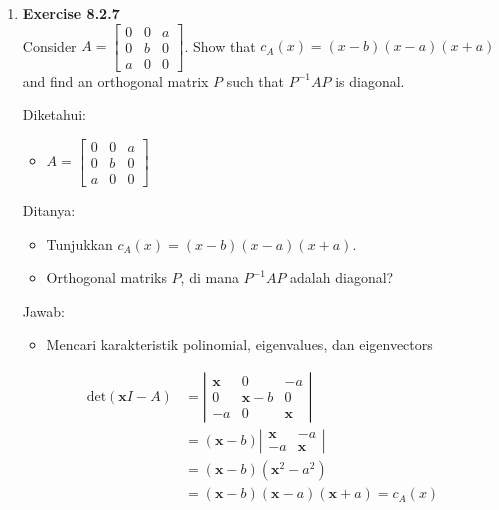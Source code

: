 \documentclass[12pt, a4paper]{scrartcl}
\begin{document}
\begin{enumerate}
\begin{enumerate}
            \end{enumerate}
            
            \item \textbf{Exercise 8.2.7}\\Consider $A = \begin{bmatrix}
                0&0&a\\
                0&b&0\\
                a&0&0
            \end{bmatrix}$. Show that $c_A(x)=(x-b)(x-a)(x+a)$ and find an orthogonal matrix $P$ such that $P^{-1}AP$ is diagonal.

            Diketahui:
            \begin{itemize}
                \item[] $A = \begin{bmatrix}
                    0&0&a\\0&b&0\\a&0&0
                \end{bmatrix}$
            \end{itemize}

            Ditanya:
            \begin{itemize}
                \item Tunjukkan $c_A(x)=(x-b)(x-a)(x+a)$.
                \item Orthogonal matriks $P$, di mana $P^{-1}AP$ adalah diagonal?
            \end{itemize}
            
            Jawab:
            \begin{itemize}
                \item[] Mencari karakteristik polinomial, eigenvalues, dan eigenvectors
            \end{itemize}
            \begin{align*}
                \mbox{det}(\textbf{x}I-A) &= \left|\begin{matrix}
                    \textbf{x}&0&-a\\0&\textbf{x}-b&0\\-a&0&\textbf{x}
                \end{matrix}\right|
                \\ &= (\textbf{x}-b) \left| \begin{matrix}
                    \textbf{x} & -a \\ -a & \textbf{x}
                \end{matrix} \right|
                \\ &= (\textbf{x} - b)(\textbf{x}^2 - a^2)
                \\ &= (\textbf{x}-b)(\textbf{x}-a)(\textbf{x}+a) = c_A(x)
            \end{align*}


\end{enumerate}
\end{document}
